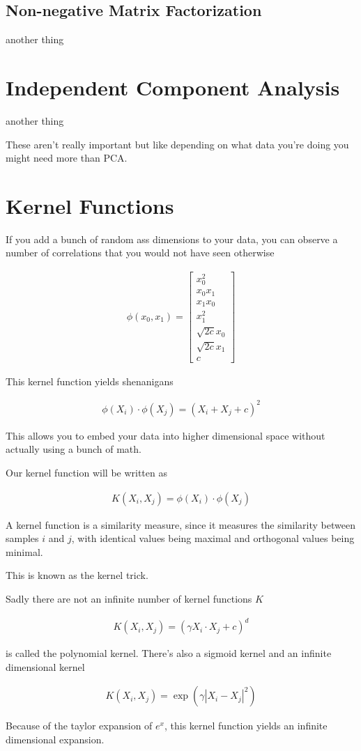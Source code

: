 \documentclass[fleqn]{report}
\newcommand{\equations} [1] {
\begin{gather*}
#1
\end{gather*}
}
\begin{document}
\subsection{Non-negative Matrix Factorization}
another thing 

\section{Independent Component Analysis}
another thing 

These aren't really important but like depending on what data you're 
doing you might need more than PCA. 

\section{Kernel Functions}
If you add a bunch of random ass dimensions to your data, you 
can observe a number of correlations that you would 
not have seen otherwise 
\equations{
    \phi(x_0, x_1)
    =
    \begin{bmatrix}
        x_0^2 \\
        x_0 x_1 \\
        x_1 x_0 \\
        x_1^2 \\
        \sqrt{2c} x_0 \\
        \sqrt{2c} x_1 \\
        c 
    \end{bmatrix}
}
This kernel function yields shenanigans 
\equations{
    \phi(X_i) \cdot \phi(X_j) = (X_i + X_j + c)^2
}
This allows you to embed your data into higher dimensional space 
without actually using a bunch of math. 

Our kernel function will be written as 
\equations{
    K(X_i, X_j) = 
    \phi(X_i) \cdot \phi(X_j)
}
A kernel function is a similarity measure, since it measures the 
similarity between samples $i$ and $j$, with identical values being 
maximal and orthogonal values being minimal. 

This is known as the kernel trick. 

Sadly there are not an infinite number of kernel functions $K$ 
\equations{
    K(X_i, X_j) = (\gamma X_i \cdot X_j + c)^d
}
is called the polynomial kernel.
There's also a sigmoid kernel and an infinite dimensional kernel 

\equations{
    K(X_{i}, X_{j}) = \exp(\gamma |X_i - X_j|^2)
}
Because of the taylor expansion of $e^x$, this kernel function 
yields an infinite dimensional expansion. 
\end{document}
